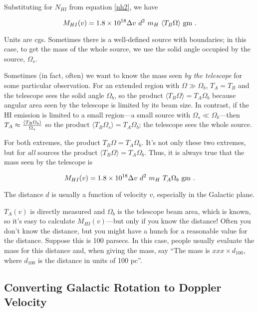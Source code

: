 \documentclass[preprint]{aastex}
\begin{document}
\noindent Substituting for $N_{HI}$ from equation \ref{nh2}, we have

\begin{equation}  \label{telemass}
M_{HI}(v) = 1.8 \times 10^{18} \Delta v \ d^2 \  m_H \ \langle T_B  \Omega\rangle \ {\rm
gm} \ . 
\end{equation}

\noindent Units are cgs. Sometimes there is a well-defined source with
boundaries; in this case, to get the mass of the whole source, we use
the solid angle occupied by the source, $\Omega_s$.

	Sometimes (in fact, often) we want to know the mass seen {\it by
the telescope} for some particular observation.  For an extended region
with $\Omega \gg \Omega_b$, $T_A = T_B$ and the telescope sees the solid
angle $\Omega_b$, so the product $\langle T_B \Omega\rangle = T_A
\Omega_b$ because angular area seen by the telescope is limited by its
beam size.  In contrast, if the HI emission is limited to a small
region---a small source with $\Omega_s \ll \Omega_b$---then $T_A \approx
{\langle T_B \Omega_b\rangle \over \Omega_s}$ so the product $\langle
T_B \Omega_s\rangle = T_A \Omega_b$; the telescope sees the whole
source.  

For both extremes, the product $T_B \Omega = T_A \Omega_b$. 
It's not only these two extremes, but for {\it all} sources the
product $\langle T_B \Omega \rangle= T_A \Omega_b$.  Thus, it is always true that the
mass seen by the telescope is

\begin{equation}  \label{telemass1}
M_{HI}(v) = 1.8 \times 10^{18} \Delta v \ d^2 \ m_H \ T_A  \Omega_b  \ {\rm
gm} \ . 
\end{equation}

\noindent The distance $d$ is usually a function of velocity $v$,
especially in the Galactic plane. 

	$T_A(v)$ is directly measured and $\Omega_b$ is the telescope
beam area, which is known, so it's easy to calculate $M_{HI}(v)$---but
only if you know the distance! Often you don't know the distance, but
you might have a hunch for a reasonable value for the distance. Suppose
this is 100 parsecs. In this
case, people usually evaluate the mass for this distance and, when
giving the mass, say ``The mass is $xxx \times d_{100}$, where $d_{100}$
is the distance in units of 100 pc''. 

\subsection{Converting Galactic Rotation to Doppler Velocity}
\end{document}
